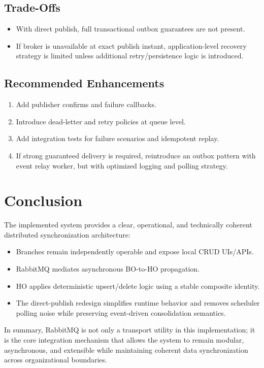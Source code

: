 \documentclass[11pt,a4paper]{article}
\begin{document}
\subsection{Trade-Offs}
\begin{itemize}[leftmargin=*]
  \item With direct publish, full transactional outbox guarantees are not present.
  \item If broker is unavailable at exact publish instant, application-level recovery strategy is limited unless additional retry/persistence logic is introduced.
\end{itemize}

\subsection{Recommended Enhancements}
\begin{enumerate}[leftmargin=*]
  \item Add publisher confirms and failure callbacks.
  \item Introduce dead-letter and retry policies at queue level.
  \item Add integration tests for failure scenarios and idempotent replay.
  \item If strong guaranteed delivery is required, reintroduce an outbox pattern with event relay worker, but with optimized logging and polling strategy.
\end{enumerate}

\section{Conclusion}
The implemented system provides a clear, operational, and technically coherent distributed synchronization architecture:
\begin{itemize}[leftmargin=*]
  \item Branches remain independently operable and expose local CRUD UIs/APIs.
  \item RabbitMQ mediates asynchronous BO-to-HO propagation.
  \item HO applies deterministic upsert/delete logic using a stable composite identity.
  \item The direct-publish redesign simplifies runtime behavior and removes scheduler polling noise while preserving event-driven consolidation semantics.
\end{itemize}

In summary, RabbitMQ is not only a transport utility in this implementation; it is the core integration mechanism that allows the system to remain modular, asynchronous, and extensible while maintaining coherent data synchronization across organizational boundaries.
\end{document}
